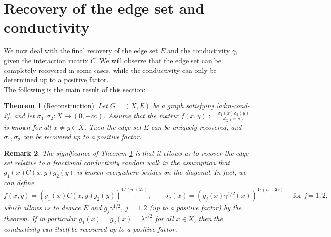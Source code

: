\documentclass[a4paper,11pt,oneside]{amsart}
\newtheorem{theorem}{Theorem}[section]
\newtheorem{remark}[theorem]{Remark}
\begin{document}
\section{Recovery of the edge set and conductivity} 

 We now deal with the final recovery of the edge set $E$ and the conductivity $\gamma$, given the interaction matrix $C$. We will observe that the edge set can be completely recovered in some cases, while the conductivity can only be determined up to a positive factor. \\

The following is the main result of this section:

\begin{theorem}[Reconstruction]\label{main-result}
Let $G=(X,E)$ be a graph satisfying \ref{adm-cond-2}, and let $\sigma_1,\sigma_2:X\rightarrow (0,+\infty)$. Assume that the  matrix $f(x,y):= \frac{\sigma_1(x)\sigma_2(y)}{ d_G(x,y) }$ is known for all $x\neq y\in X$. Then the edge set $E$ can be uniquely recovered, and $\sigma_1, \sigma_2$ can be recovered up to a positive factor.
\end{theorem}

\begin{remark}\label{significance}
The significance of Theorem \ref{main-result} is that it allows us to recover the edge set relative to a fractional conductivity random walk in the assumption that $g_1(x) \tilde C(x,y) g_2(y)$ is known everywhere besides on the diagonal. In fact, we can define
$$ f(x,y)=\left(g_1(x) \tilde C(x,y) g_2(y)\right)^{1/(n+2s)}, \qquad \sigma_j(x) = \left(g_j(x)\gamma^{1/2}(x)\right)^{1/(n+2s)} \quad \mbox{ for } j=1,2,$$
which allows us to deduce $E$ and $g_j\gamma^{1/2}$, $j=1,2$ (up to a positive factor) by the theorem. If in particular $g_1(x)=g_2(x)=\lambda^{1/2}$ for all $x\in X$, then the conductivity can itself be recovered up to a positive factor.
\end{remark}
\end{document}
